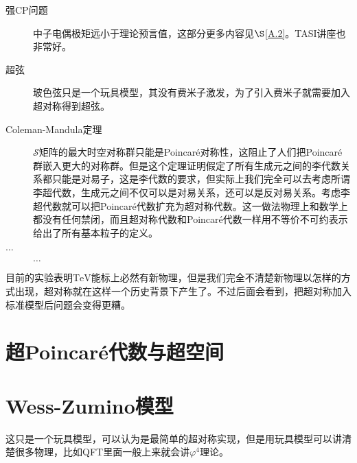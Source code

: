 \begin{description}
	\item[强CP问题] 中子电偶极矩远小于理论预言值，这部分更多内容见$\S$\ref{A.2}。TASI讲座\cite{Hook:2018dlk}也非常好。
 	\item[超弦]玻色弦只是一个玩具模型，其没有费米子激发，为了引入费米子就需要加入超对称得到超弦。
	\item[Coleman-Mandula定理] $\mathcal S$矩阵的最大时空对称群只能是Poincar\'e对称性，这阻止了人们把Poincar\'e群嵌入更大的对称群\cite{PhysRev.159.1251}。但是这个定理证明假定了所有生成元之间的李代数关系都只能是对易子，这是李代数的要求，但实际上我们完全可以去考虑所谓李超代数\cite{superlie}，生成元之间不仅可以是对易关系，还可以是反对易关系。考虑李超代数就可以把Poincar\'e代数扩充为超对称代数\cite{Haag:1974qh}。这一做法物理上和数学上都没有任何禁闭，而且超对称代数和Poincar\'e代数一样用不等价不可约表示给出了所有基本粒子的定义。
	\item [$\ldots$]$\ldots$
\end{description}

\PRLsep

目前的实验表明$\mathrm{TeV}$能标上必然有新物理，但是我们完全不清楚新物理以怎样的方式出现，超对称就在这样一个历史背景下产生了。不过后面会看到，把超对称加入标准模型后问题会变得更糟。

\section{超Poincar\'e代数与超空间}


\section{Wess-Zumino模型}
这只是一个玩具模型，可以认为是最简单的超对称实现，但是用玩具模型可以讲清楚很多物理，比如QFT里面一般上来就会讲$\varphi^4$理论。